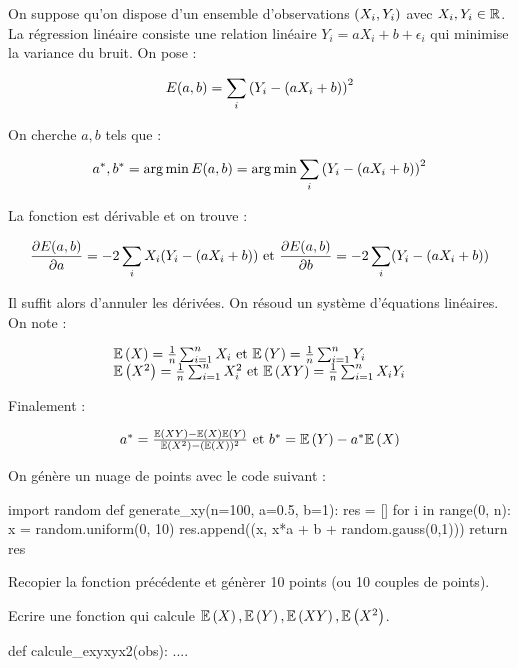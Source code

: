 \exosubject{}
\begin{xexercice}\label{td_note_label2_2017}%

On suppose qu'on dispose d'un ensemble d'observations $\left(X_i, Y_i\right)$ avec $X_i, Y_i \in \mathbb{R}$.
La régression linéaire consiste une relation linéaire $Y_i = a X_i + b + \epsilon_i$
qui minimise la variance du bruit. On pose :

$$
E(a, b) = \sum_i \left(Y_i - (a X_i + b)\right)^2
$$


On cherche $a, b$ tels que :

$$
a^*, b^* = \arg \min E(a, b) = \arg \min \sum_i \left(Y_i - (a X_i + b)\right)^2
$$

La fonction est dérivable et on trouve :

$$
\frac{\partial E(a,b)}{\partial a} = - 2 \sum_i X_i ( Y_i - (a X_i + b))
\text{ et } \frac{\partial E(a,b)}{\partial b} = - 2 \sum_i ( Y_i - (a X_i + b))
$$

Il suffit alors d'annuler les dérivées. On résoud un système d'équations linéaires. On note :

$$
\begin{array}{l}
\mathbb{E}\left(X\right) = \frac{1}{n}\sum_{i=1}^n X_i \text{ et } \mathbb{E}\left(Y\right) = \frac{1}{n}\sum_{i=1}^n Y_i \\
\mathbb{E}\left(X^2\right) = \frac{1}{n}\sum_{i=1}^n X_i^2 \text{ et } \mathbb{E}\left(XY\right) = \frac{1}{n}\sum_{i=1}^n X_i Y_i 
\end{array}
$$

Finalement :

$$
\begin{array}{l}
a^* = \frac{ \mathbb{E}\left(XY\right) - \mathbb{E}\left(X\right) \mathbb{E}\left(Y\right)}{\mathbb{E}\left(X^2\right) - (\mathbb{E}\left(X\right))^2} \text{ et } b^* = \mathbb{E}\left(Y\right) - a^* \mathbb{E}\left(X\right)
\end{array}
$$

On génère un nuage de points avec le code suivant :

\begin{verbatimx}
import random
def generate_xy(n=100, a=0.5, b=1):
    res = []
    for i in range(0, n):
        x = random.uniform(0, 10)
        res.append((x, x*a + b + random.gauss(0,1)))
    return res
\end{verbatimx}

\exequest Recopier la fonction précédente et génèrer 10 points (ou 10 couples de points).

\exequest Ecrire une fonction qui calcule $\mathbb{E}\left(X\right), \mathbb{E}\left(Y\right), \mathbb{E}\left(XY\right), \mathbb{E}\left(X^2\right)$.

\begin{verbatimx}
def calcule_exyxyx2(obs):
    ....
\end{verbatimx}



\end{xexercice}
